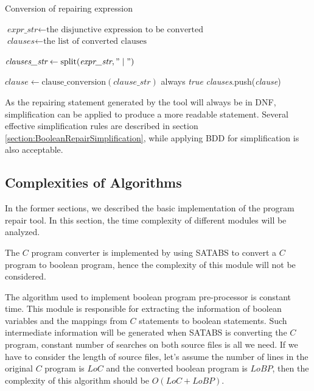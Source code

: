 \documentclass[10pt,journal,final,]{article}
\theoremstyle{definition}
\begin{document}
\begin{algorithm}
\caption{Conversion of repairing expression}
\begin{algorithmic}[1]

\STATE $\textit{expr\_str} \gets \text{the disjunctive expression to be converted}$
\STATE $\textit{clauses} \gets \text{the list of converted clauses}$
\STATE

\STATE $\textit{clauses\_str} \gets \text{split}(\textit{expr\_str}, "\mid")$

  \STATE $\textit{clause} \gets \text{clause\_conversion}(\textit{clause\_str})$
    \RETURN always \textit{true}
  \ENDIF
  \STATE \textit{clauses}.push(\textit{clause})
\ENDFOR

\end{algorithmic}
\end{algorithm}

As the repairing statement generated by the tool will always be in DNF, simplification can be applied to produce a more readable statement.
Several effective simplification rules are described in section \ref{section:BooleanRepairSimplification}, while applying BDD for simplification is also acceptable.

\subsection{Complexities of Algorithms}
In the former sections, we described the basic implementation of the program repair tool. In this section, the time complexity of different modules will be analyzed.

The $C$ program converter is implemented by using SATABS to convert a $C$ program to boolean program, hence the complexity of this module will not be considered.

The algorithm used to implement boolean program pre-processor is constant time.
This module is responsible for extracting the information of boolean variables and the mappings from $C$ statements to boolean statements.
Such intermediate information will be generated when SATABS is converting the $C$ program, constant number of searches on both source files is all we need.
If we have to consider the length of source files, let's assume the number of lines in the original $C$ program is $LoC$ and the converted boolean program is $LoBP$,
then the complexity of this algorithm should be $O(LoC + LoBP)$.
\end{document}
